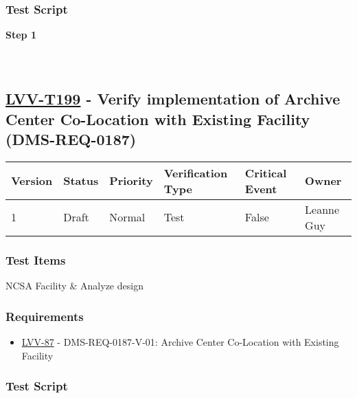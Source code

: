 \hypertarget{test-script-175}{%
\subsubsection{Test Script}\label{test-script-175}}

\textbf{Step 1}\\
~\\
~\\

\hypertarget{lvv-t199---verify-implementation-of-archive-center-co-location-with-existing-facility-dms-req-0187}{%
\subsection{\texorpdfstring{\href{https://jira.lsstcorp.org/secure/Tests.jspa\#/testCase/LVV-T199}{LVV-T199}
- Verify implementation of Archive Center Co-Location with Existing
Facility
(DMS-REQ-0187)}{LVV-T199 - Verify implementation of Archive Center Co-Location with Existing Facility (DMS-REQ-0187)}}\label{lvv-t199---verify-implementation-of-archive-center-co-location-with-existing-facility-dms-req-0187}}

\begin{longtable}[]{@{}llllll@{}}
\toprule
Version & Status & Priority & Verification Type & Critical Event &
Owner\tabularnewline
\midrule
\endhead
1 & Draft & Normal & Test & False & Leanne Guy\tabularnewline
\bottomrule
\end{longtable}

\hypertarget{test-items-175}{%
\subsubsection{Test Items}\label{test-items-175}}

NCSA Facility \& Analyze design

\hypertarget{requirements-176}{%
\subsubsection{Requirements}\label{requirements-176}}

\begin{itemize}
\tightlist
\item
  \href{https://jira.lsstcorp.org/browse/LVV-87}{LVV-87} -
  DMS-REQ-0187-V-01: Archive Center Co-Location with Existing Facility
\end{itemize}

\hypertarget{test-script-176}{%
\subsubsection{Test Script}\label{test-script-176}}

